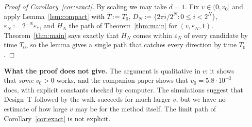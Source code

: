 \begin{proof}[Proof of Corollary~\ref{cor:exact}]
By scaling we may take $d=1$. Fix $v\in(0,v_0]$ and apply Lemma~\ref{lem:compact} with $\bar T:=T_0$,
$D_N:=\{2\pi i/2^N:0\le i<2^N\}$, $\varepsilon_N:=2^{-N}\varepsilon_*$, and $H_N$ the path of Theorem~\ref{thm:main}
for $(v,\varepsilon_N,1)$. Theorem~\ref{thm:main} says exactly that $H_N$ comes within $\varepsilon_N$ of every candidate
by time $T_0$, so the lemma gives a single path that catches every direction by time $T_0$.
\end{proof}

\textbf{What the proof does not give.} The argument is qualitative in $v$: it shows that \emph{some} $v_0>0$ works, and
the companion paper \cite{short} shows that $v_0=5.8\cdot10^{-3}$ does, with explicit constants checked by computer. The
simulations suggest that Design~T followed by the walk succeeds for much larger $v$, but we have no estimate of how
large $v$ may be for the method itself. The limit path of Corollary~\ref{cor:exact} is not explicit.
